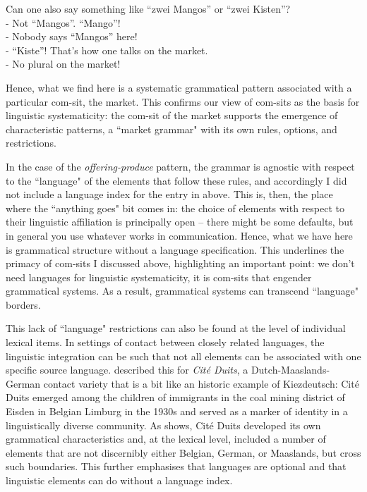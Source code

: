 \ea Can one also say something like “zwei Mangos” or “zwei Kisten”?\\
{}-  Not “Mangos”. “Mango”!\\
{}-  Nobody says “Mangos” here!\\
{}-  “Kiste”! That’s how one talks on the market.\\
{}-  No plural on the market!
\z

Hence, what we find here is a systematic grammatical pattern associated with a particular com-sit, the market. This confirms our view of com-sits as the basis for linguistic systematicity: the com-sit of the market supports the emergence of characteristic patterns, a “market grammar" with its own rules, options, and restrictions.

In the case of the \textit{offering-produce} pattern, the grammar is agnostic with respect to the “language" of the elements that follow these rules, and accordingly I did not include a language index for the entry in  above. This is, then, the place where the “anything goes" bit comes in: the choice of elements with respect to their linguistic affiliation is principally open – there might be some defaults, but in general you use whatever works in communication. Hence, what we have here is grammatical structure without a language specification. This underlines the primacy of com-sits I discussed above, highlighting an important point: we don’t need languages for linguistic systematicity, it is com-sits that engender grammatical systems. As a result, grammatical systems can transcend “language" borders.

This lack of “language" restrictions can also be found at the level of individual lexical items. In settings of contact between closely related languages, the linguistic integration can be such that not all elements can be associated with one specific source language. \citet{Pecht2021} described this for \textit{Cité Duits}, a Dutch-Maaslands-German contact variety that is a bit like an historic example of Kiezdeutsch: Cité Duits emerged among the children of immigrants in the coal mining district of Eisden in Belgian Limburg in the 1930s and served as a marker of identity in a linguistically diverse community. As \citet{Pecht2021} shows, Cité Duits developed its own grammatical characteristics and, at the lexical level, included a number of elements that are not discernibly either Belgian, German, or Maaslands, but cross such boundaries. This further emphasises that languages are optional and that linguistic elements can do without a language index.


